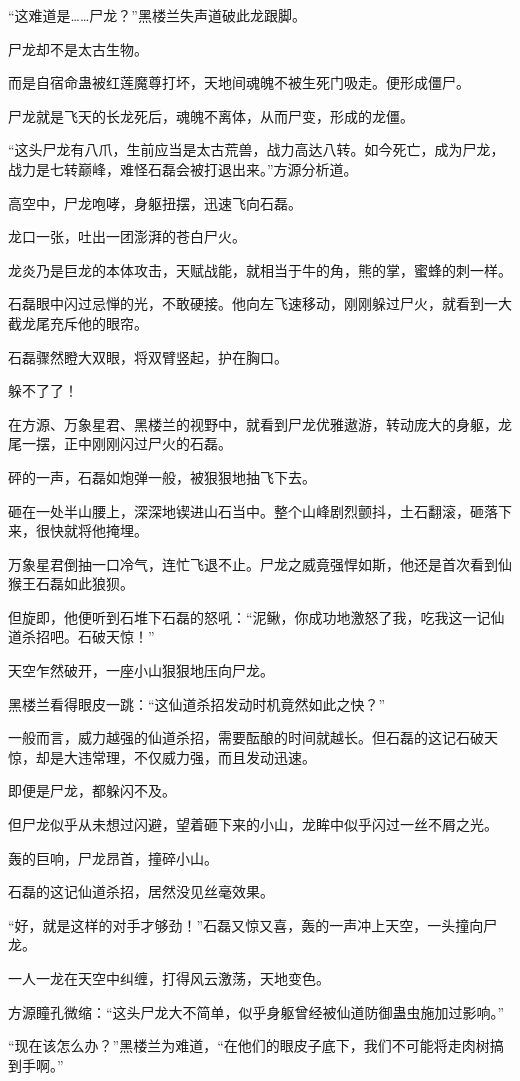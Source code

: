 \begin{this_body}
“这难道是……尸龙？”黑楼兰失声道破此龙跟脚。

尸龙却不是太古生物。

而是自宿命蛊被红莲魔尊打坏，天地间魂魄不被生死门吸走。便形成僵尸。

尸龙就是飞天的长龙死后，魂魄不离体，从而尸变，形成的龙僵。

“这头尸龙有八爪，生前应当是太古荒兽，战力高达八转。如今死亡，成为尸龙，战力是七转巅峰，难怪石磊会被打退出来。”方源分析道。

高空中，尸龙咆哮，身躯扭摆，迅速飞向石磊。

龙口一张，吐出一团澎湃的苍白尸火。

龙炎乃是巨龙的本体攻击，天赋战能，就相当于牛的角，熊的掌，蜜蜂的刺一样。

石磊眼中闪过忌惮的光，不敢硬接。他向左飞速移动，刚刚躲过尸火，就看到一大截龙尾充斥他的眼帘。

石磊骤然瞪大双眼，将双臂竖起，护在胸口。

躲不了了！

在方源、万象星君、黑楼兰的视野中，就看到尸龙优雅遨游，转动庞大的身躯，龙尾一摆，正中刚刚闪过尸火的石磊。

砰的一声，石磊如炮弹一般，被狠狠地抽飞下去。

砸在一处半山腰上，深深地锲进山石当中。整个山峰剧烈颤抖，土石翻滚，砸落下来，很快就将他掩埋。

万象星君倒抽一口冷气，连忙飞退不止。尸龙之威竟强悍如斯，他还是首次看到仙猴王石磊如此狼狈。

但旋即，他便听到石堆下石磊的怒吼：“泥鳅，你成功地激怒了我，吃我这一记仙道杀招吧。石破天惊！”

天空乍然破开，一座小山狠狠地压向尸龙。

黑楼兰看得眼皮一跳：“这仙道杀招发动时机竟然如此之快？”

一般而言，威力越强的仙道杀招，需要酝酿的时间就越长。但石磊的这记石破天惊，却是大违常理，不仅威力强，而且发动迅速。

即便是尸龙，都躲闪不及。

但尸龙似乎从未想过闪避，望着砸下来的小山，龙眸中似乎闪过一丝不屑之光。

轰的巨响，尸龙昂首，撞碎小山。

石磊的这记仙道杀招，居然没见丝毫效果。

“好，就是这样的对手才够劲！”石磊又惊又喜，轰的一声冲上天空，一头撞向尸龙。

一人一龙在天空中纠缠，打得风云激荡，天地变色。

方源瞳孔微缩：“这头尸龙大不简单，似乎身躯曾经被仙道防御蛊虫施加过影响。”

“现在该怎么办？”黑楼兰为难道，“在他们的眼皮子底下，我们不可能将走肉树搞到手啊。”

\end{this_body}

